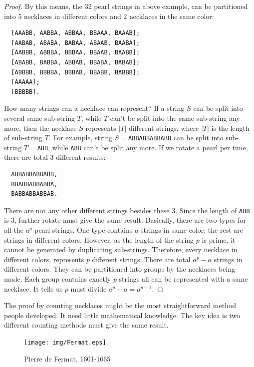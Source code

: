 \documentclass{article}
\begin{document}
\begin{proof}
By this means, the 32 pearl strings in above example, can be partitioned into 5 necklaces in different colors and 2 necklaces in the same color:

\begin{verbatim}
  [AAABB, AABBA, ABBAA, BBAAA, BAAAB];
  [AABAB, ABABA, BABAA, ABAAB, BAABA];
  [AABBB, ABBBA, BBBAA, BBAAB, BAABB];
  [ABABB, BABBA, ABBAB, BBABA, BABAB];
  [ABBBB, BBBBA, BBBAB, BBABB, BABBB];
  [AAAAA];
  [BBBBB].
\end{verbatim}

How many strings can a necklace can represent? If a string $S$ can be split into several same sub-string $T$, while $T$ can't be split into the same sub-string any more, then the necklace $S$ represents $|T|$ different strings, where $|T|$ is the length of sub-string $T$. For example, string $S=$\texttt{ABBABBABBABB} can be split into sub-string $T=$\texttt{ABB}, while \texttt{ABB} can't be split any more. If we rotate a pearl per time, there are total 3 different results:

\begin{verbatim}
  ABBABBABBABB,
  BBABBABBABBA,
  BABBABBABBAB.
\end{verbatim}

There are not any other different strings besides these 3. Since the length of \texttt{ABB} is 3, further rotate must give the same result. Basically, there are two types for all the $a^p$ pearl strings. One type contains $a$ strings in same color; the rest are strings in different colors. However, as the length of the string $p$ is prime, it cannot be generated by duplicating sub-strings. Therefore, every necklace in different colors, represents $p$ different strings. There are total $a^p -a$ strings in different colors. They can be partitioned into groups by the necklaces being made. Each group contains exactly $p$ strings all can be represented with a same necklace. It tells us $p$ must divide $a^p-a = a^{p-1}$.

\end{proof}

The proof by counting necklaces might be the most straightforward method people developed. It need little mathematical knowledge. The key idea is two different counting methods must give the same result.

\begin{figure}
  \centering %
 \texttt{[image: img/Fermat.eps]}
 \captionsetup{labelformat=empty}
 \caption{Pierre de Fermat, 1601-1665}
 \label{fig:Fermat}
\end{figure}
\end{document}
